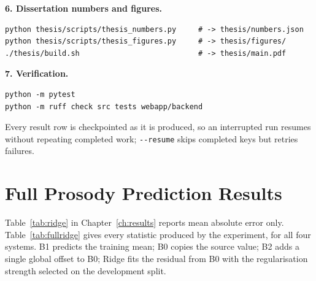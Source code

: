 {\noindent\textbf{6. Dissertation numbers and figures.}
{\footnotesize\begin{verbatim}
python thesis/scripts/thesis_numbers.py     # -> thesis/numbers.json
python thesis/scripts/thesis_figures.py     # -> thesis/figures/
./thesis/build.sh                           # -> thesis/main.pdf
\end{verbatim}}

\noindent\textbf{7. Verification.}
{\footnotesize\begin{verbatim}
python -m pytest
python -m ruff check src tests webapp/backend
\end{verbatim}}
\par}

\vspace{0.4\baselineskip}
Every result row is checkpointed as it is produced, so an interrupted run resumes without
repeating completed work; \verb|--resume| skips completed keys but retries failures.

\chapter{Full Prosody Prediction Results}
\label{app:tables}

Table~\ref{tab:ridge} in Chapter~\ref{ch:results} reports mean absolute error only.
Table~\ref{tab:fullridge} gives every statistic produced by the experiment, for all four systems.
B1 predicts the training mean; B0 copies the source value; B2 adds a single global offset to B0;
Ridge fits the residual from B0 with the regularisation strength selected on the development split.

